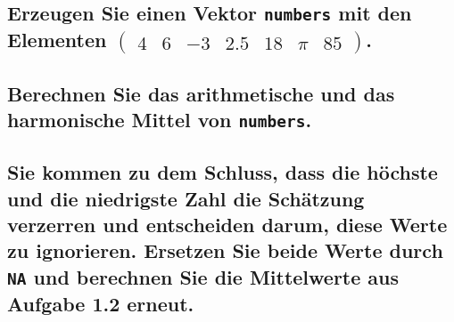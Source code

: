 \documentclass[12pt,a4paper]{article}
\begin{document}
\hypertarget{erzeugen-sie-einen-vektor-mit-den-elementen-beginpmatrix-4-6--3-2.5-18-pi-85-endpmatrix.}{%
\subsection{\texorpdfstring{Erzeugen Sie einen Vektor \texttt{numbers}
mit den Elementen
\(\begin{pmatrix} 4 & 6 & -3 & 2.5 & 18 & \pi & 85 \end{pmatrix}\).}{Erzeugen Sie einen Vektor  mit den Elementen \textbackslash begin\{pmatrix\} 4 \& 6 \& -3 \& 2.5 \& 18 \& \textbackslash pi \& 85 \textbackslash end\{pmatrix\}.}}\label{erzeugen-sie-einen-vektor-mit-den-elementen-beginpmatrix-4-6--3-2.5-18-pi-85-endpmatrix.}}

\hypertarget{berechnen-sie-das-arithmetische-und-das-harmonische-mittel-von-.}{%
\subsection{\texorpdfstring{Berechnen Sie das arithmetische und das
harmonische Mittel von
\texttt{numbers}.}{Berechnen Sie das arithmetische und das harmonische Mittel von .}}\label{berechnen-sie-das-arithmetische-und-das-harmonische-mittel-von-.}}

\hypertarget{sie-kommen-zu-dem-schluss-dass-die-huxf6chste-und-die-niedrigste-zahl-die-schuxe4tzung-verzerren-und-entscheiden-darum-diese-werte-zu-ignorieren.-ersetzen-sie-beide-werte-durch-und-berechnen-sie-die-mittelwerte-aus-aufgabe-1.2-erneut.}{%
\subsection{\texorpdfstring{Sie kommen zu dem Schluss, dass die höchste
und die niedrigste Zahl die Schätzung verzerren und entscheiden darum,
diese Werte zu ignorieren. Ersetzen Sie beide Werte durch \texttt{NA}
und berechnen Sie die Mittelwerte aus Aufgabe 1.2
erneut.}{Sie kommen zu dem Schluss, dass die höchste und die niedrigste Zahl die Schätzung verzerren und entscheiden darum, diese Werte zu ignorieren. Ersetzen Sie beide Werte durch  und berechnen Sie die Mittelwerte aus Aufgabe 1.2 erneut.}}\label{sie-kommen-zu-dem-schluss-dass-die-huxf6chste-und-die-niedrigste-zahl-die-schuxe4tzung-verzerren-und-entscheiden-darum-diese-werte-zu-ignorieren.-ersetzen-sie-beide-werte-durch-und-berechnen-sie-die-mittelwerte-aus-aufgabe-1.2-erneut.}}
\end{document}
